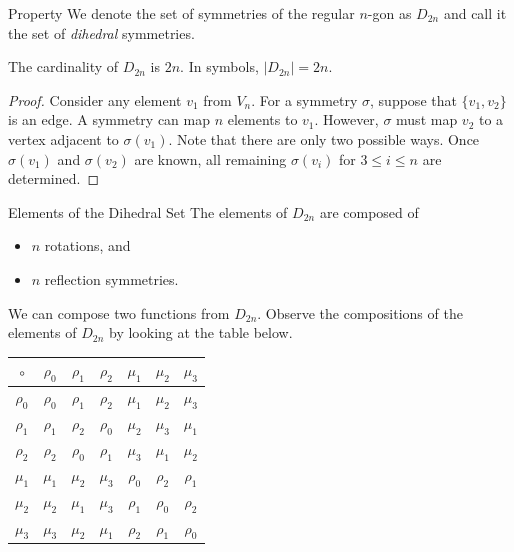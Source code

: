 \documentclass{beamer}
\begin{document}
\begin{frame}{Property}
We denote the set of symmetries of the regular $n$-gon as $D_{2n}$ and call it the set of \emph{dihedral} symmetries.
\pause
\begin{theorem}
The cardinality of $D_{2n}$ is $2n$. In symbols, $|D_{2n}| = 2n$.    
\end{theorem}
\pause
\begin{proof}
\justifying
Consider any element $v_1$ from $V_n$. For a symmetry $\sigma$, suppose that $\{v_1, v_2\}$ is an edge. A symmetry can map $n$ elements to $v_1$. However, $\sigma$ must map $v_2$ to a vertex adjacent to $\sigma(v_1)$. Note that there are only two possible ways. Once $\sigma(v_1)$ and $\sigma(v_2)$ are known, all remaining $\sigma(v_i)$ for $3 \leq i \leq n$ are determined. 
\end{proof}
\end{frame}

\begin{frame}{Elements of the Dihedral Set}
\justifying
The elements of $D_{2n}$ are composed of
\begin{itemize}
    \item $n$ rotations, and
    \item $n$ reflection symmetries.
\end{itemize}
We can compose two functions from $D_{2n}$. Observe the compositions of the elements of $D_{2n}$ by looking at the table below.
\begin{table}
\centering
\begin{tabular}{c|c|c|c|c|c|c}
$\circ$ & $\rho_0$ & $\rho_1$ & $\rho_2$ & $\mu_1$ & $\mu_2$ & $\mu_3$ \\
\hline
$\rho_0$ & $\rho_0$ & $\rho_1$ & $\rho_2$ & $\mu_1$ & $\mu_2$ & $\mu_3$ \\
\hline
$\rho_1$ & $\rho_1$ & $\rho_2$ & $\rho_0$ & $\mu_2$ & $\mu_3$ & $\mu_1$ \\
\hline
$\rho_2$ & $\rho_2$ & $\rho_0$ & $\rho_1$ & $\mu_3$ & $\mu_1$ & $\mu_2$ \\
\hline
$\mu_1$ & $\mu_1$ & $\mu_2$ & $\mu_3$ & $\rho_0$ & $\rho_2$ & $\rho_1$ \\
\hline
$\mu_2$ & $\mu_2$ & $\mu_1$ & $\mu_3$ & $\rho_1$ & $\rho_0$ & $\rho_2$ \\
\hline
$\mu_3$ & $\mu_3$ & $\mu_2$ & $\mu_1$ & $\rho_2$ & $\rho_1$ & $\rho_0$ \\
\end{tabular}
\end{table}
\end{frame}
\end{document}
